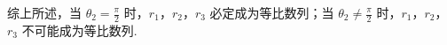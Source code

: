 \begin{solution}
\begin{enumerate}
\begin{enumerate}
\end{enumerate}
综上所述，当 \(\theta_2=\frac{\pi}{2}\) 时，\(r_1\)，\(r_2\)，\(r_3\) 必定成为等比数列；当 \(\theta_2\neq \frac{\pi}{2}\) 时，\(r_1\)，\(r_2\)，\(r_3\) 不可能成为等比数列.
\end{enumerate}
\end{solution}
